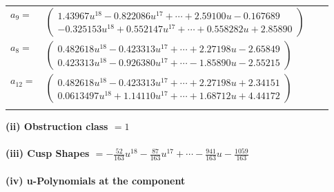 \documentclass[1p]{elsarticle_modified}
\theoremstyle{definition}
\begin{document}
\begin{tabular}{m{7pt} m{180pt} m{7pt} m{180pt} }
\flushright $a_{9}=$&$\begin{pmatrix}1.43967 u^{18}-0.822086 u^{17}+\cdots+2.59100 u-0.167689\\-0.325153 u^{18}+0.552147 u^{17}+\cdots+0.558282 u+2.85890\end{pmatrix}$ \\
\flushright $a_{8}=$&$\begin{pmatrix}0.482618 u^{18}-0.423313 u^{17}+\cdots+2.27198 u-2.65849\\0.423313 u^{18}-0.926380 u^{17}+\cdots-1.85890 u-2.55215\end{pmatrix}$ \\
\flushright $a_{12}=$&$\begin{pmatrix}0.482618 u^{18}-0.423313 u^{17}+\cdots+2.27198 u+2.34151\\0.0613497 u^{18}+1.14110 u^{17}+\cdots+1.68712 u+4.44172\end{pmatrix}$\\&\end{tabular}
\flushleft \textbf{(ii) Obstruction class $= 1$}\\~\\
\flushleft \textbf{(iii) Cusp Shapes $= -\frac{52}{163} u^{18}-\frac{87}{163} u^{17}+\cdots-\frac{941}{163} u-\frac{1059}{163}$}\\~\\
\newpage\renewcommand{\arraystretch}{1}
\flushleft \textbf{(iv) u-Polynomials at the component}\newline \\
\end{document}
